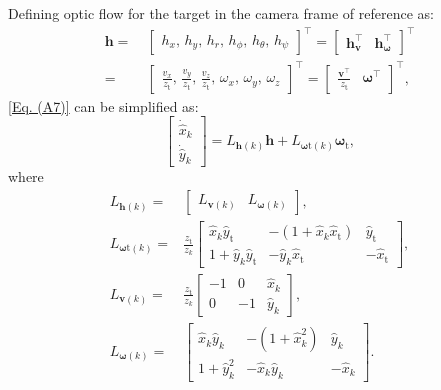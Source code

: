 \documentclass[lettersize,journal]{IEEEtran}
\begin{document}
Defining optic flow for the target in the camera frame of reference as:
\begin{align} \label{Eq. (A8)}
    \boldsymbol{h} =& ~ \begin{bmatrix}
        h_x,\, h_y,\, h_r,\, h_{\phi}, \, h_{\theta}, \, h_{\psi}
    \end{bmatrix}^{\top} = \begin{bmatrix} 
        \boldsymbol{h}_{\boldsymbol{v}}^{\top} & \boldsymbol{h}_{\boldsymbol{\omega}}^{\top}
    \end{bmatrix}^{\top} \nonumber \\
    =& ~ \begin{bmatrix}
        \frac{v_x}{z_{\text{t}}},\, \frac{v_y}{z_{\text{t}}},\, \frac{v_z}{z_{\text{t}}},\, \omega_{x}, \, \omega_{y}, \, \omega_{z}
    \end{bmatrix}^{\top} = \begin{bmatrix} 
        \frac{\boldsymbol{v}^{\top}}{z_{\text{t}}} & \boldsymbol{\omega}^{\top}
    \end{bmatrix}^{\top},
\end{align}
\eqref{Eq. (A7)} can be simplified as:
\begin{equation} \label{Eq. (A9)}
    \begin{bmatrix} \dot{\hat{x}}_{k} \\ \dot{\hat{y}}_{k} \end{bmatrix}
    = L_{\boldsymbol{h}(k)} \boldsymbol{h} + L_{\boldsymbol{\omega}\text{t}(k)} \boldsymbol{\omega}_{\text{t}},
\end{equation}
where
\begin{align*}
    L_{\boldsymbol{h}(k)} =& \begin{bmatrix} L_{\boldsymbol{v}(k)} & L_{\boldsymbol{\omega}(k)} \end{bmatrix}, \\
    L_{\boldsymbol{\omega}\text{t}(k)} =& \frac{z_{\text{t}}}{z_{k}} \begin{bmatrix} \hat{x}_{k} \hat{y}_{\text{t}} & - (1 + \hat{x}_{k} \hat{x}_{\text{t}}) & \hat{y}_{\text{t}} \\
    1 + \hat{y}_{k} \hat{y}_{\text{t}} & - \hat{y}_{k} \hat{x}_{\text{t}} & - \hat{x}_{\text{t}} \end{bmatrix}, \\
    L_{\boldsymbol{v}(k)} =& \frac{z_{\text{t}}}{z_{k}} \begin{bmatrix} - 1 & 0 & \hat{x}_k \\ 0 & -1 & \hat{y}_k\end{bmatrix},\\
    L_{\boldsymbol{\omega}(k)} =& \begin{bmatrix} \hat{x}_k \hat{y}_k & - (1 + \hat{x}_k^2) & \hat{y}_k \\
    1 + \hat{y}_k^2 & - \hat{x}_k \hat{y}_k & - \hat{x}_k\end{bmatrix}.
\end{align*}
\end{document}
